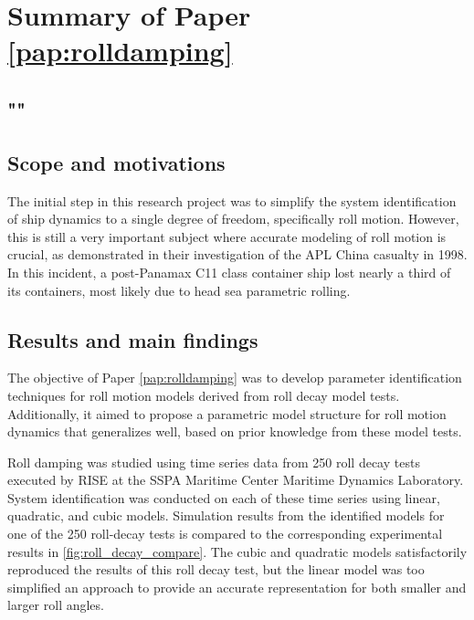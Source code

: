 \section{Summary of Paper \ref{pap:rolldamping}}
\subsection*{""}
\subsection*{Scope and motivations}
The initial step in this research project was to simplify the system identification of ship dynamics to a single degree of freedom, specifically roll motion. However, this is still a very important subject where accurate modeling of roll motion is crucial, as \textcite{franceInvestigationHeadSeaParametric2001} demonstrated in their investigation of the APL China casualty in 1998. In this incident, a post-Panamax C11 class container ship lost nearly a third of its containers, most likely due to head sea parametric rolling.

\subsection*{Results and main findings}
The objective of Paper \ref{pap:rolldamping} was to develop parameter identification techniques for roll motion models derived from roll decay model tests. Additionally, it aimed to propose a parametric model structure for roll motion dynamics that generalizes well, based on prior knowledge from these model tests.

Roll damping was studied using time series data from 250 roll decay tests executed by RISE at the SSPA Maritime Center Maritime Dynamics Laboratory.
System identification was conducted on each of these time series using linear, quadratic, and cubic models. Simulation results from the identified models for one of the 250 roll-decay tests is compared to the corresponding experimental results in \autoref{fig:roll_decay_compare}. The cubic and quadratic models satisfactorily reproduced the results of this roll decay test, but the linear model was too simplified an approach to provide an accurate representation for both smaller and larger roll angles.

